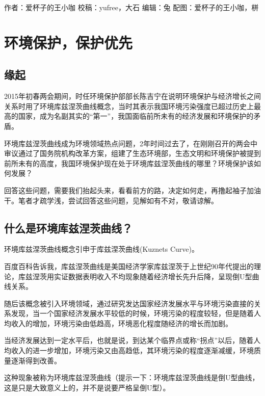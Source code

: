 \documentclass[
]{book}
\begin{document}
作者：爱杯子的王小咖
校稿：yufree，大石
编辑：兔
配图：爱杯子的王小咖，栟

\hypertarget{ux73afux5883ux4fddux62a4ux4fddux62a4ux4f18ux5148}{%
\section{环境保护，保护优先}\label{ux73afux5883ux4fddux62a4ux4fddux62a4ux4f18ux5148}}

\hypertarget{ux7f18ux8d77}{%
\subsection{缘起}\label{ux7f18ux8d77}}

2015年初春两会期间，时任环境保护部部长陈吉宁在说明环境保护与经济增长之间关系时用了环境库兹涅茨曲线概念，当时其表示我国环境污染强度已超过历史上最高的国家，成为名副其实的``第一''，我国面临前所未有的经济发展和环境保护的矛盾。

环境库兹涅茨曲线成为环境领域热点问题，2年时间过去了，在刚刚召开的两会中审议通过了国务院机构改革方案，组建了生态环境部，生态文明和环境保护被提到前所未有的高度，我国环境保护现在处于环境库兹涅茨曲线的哪里？环境保护该如何发展？

回答这些问题，需要我们抬起头来，看看前方的路，决定如何走，再撸起袖子加油干。笔者才疏学浅，尝试回答这些问题，见解如有不对，敬请谅解。

\hypertarget{ux4ec0ux4e48ux662fux73afux5883ux5e93ux5179ux6d85ux8328ux66f2ux7ebf}{%
\subsection{什么是环境库兹涅茨曲线？}\label{ux4ec0ux4e48ux662fux73afux5883ux5e93ux5179ux6d85ux8328ux66f2ux7ebf}}

环境库兹涅茨曲线概念引申于库兹涅茨曲线(Kuznets Curve)。

百度百科告诉我，库兹涅茨曲线是美国经济学家库兹涅茨于上世纪90年代提出的理论，库兹涅茨用实证数据表明收入不均现象随着经济增长先升后降，呈现倒U型曲线关系。

随后该概念被引入环境领域，通过研究发达国家经济发展水平与环境污染直接的关系发现，当一个国家经济发展水平较低的时候，环境污染的程度较轻，但是随着人均收入的增加，环境污染由低趋高，环境恶化程度随经济的增长而加剧。

当经济发展达到一定水平后，也就是说，到达某个临界点或称``拐点''以后，随着人均收入的进一步增加，环境污染又由高趋低，其环境污染的程度逐渐减缓，环境质量逐渐得到改善。

这种现象被称为环境库兹涅茨曲线（提示一下：环境库兹涅茨曲线是倒U型曲线，这是只是大致意义上的，并不是说要严格呈倒U型）。
\end{document}
